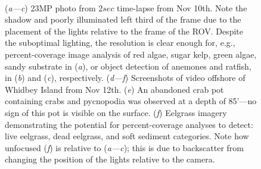 \documentclass[11pt]{article}
\begin{document}
\begin{figure}[h!]
\centering 
{}
\\
\caption{
(\textit{a---c}) 23MP photo from 2$sec$ time-lapse from Nov 10th. 
Note the shadow and poorly illuminated left third of the frame due to 
the placement of the lights relative to the frame of the ROV. 
Despite the suboptimal lighting, the resolution is clear enough for, 
e.g., percent-coverage image analysis of red algae, sugar kelp, green 
algae, sandy substrate in (\textit{a}), or object detection of anemones 
and ratfish, in (\textit{b}) and (\textit{c}), respectively.		
(\textit{d---f}) Screenshots of video offshore of Whidbey Island from 
Nov 12th. 
(\textit{e}) An abandoned crab pot containing crabs and pycnopodia was 
observed at a depth of 85'---no sign of this pot is visible on the 
surface.
(\textit{f}) Eelgrass imagery demonstrating the potential for 
percent-coverage analyses to detect: live eelgrass, dead eelgrass, 
and soft sediment categories. 
Note how unfocused (\textit{f}) is relative to (\textit{a---c});
this is due to backscatter from changing the position of the lights 
relative to the camera. 
}
\label{fig:images}
\end{figure}
\end{document}

